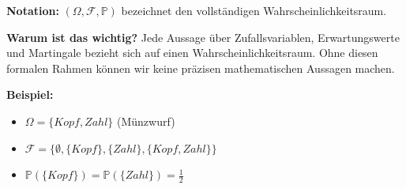 \begin{denoobification}[Wahrscheinlichkeitsraum]
\textbf{Notation:} $(\Omega, \mathcal{F}, \mathbb{P})$ bezeichnet den vollständigen Wahrscheinlichkeitsraum.

\textbf{Warum ist das wichtig?} Jede Aussage über Zufallsvariablen, Erwartungswerte und Martingale bezieht sich auf einen Wahrscheinlichkeitsraum. Ohne diesen formalen Rahmen können wir keine präzisen mathematischen Aussagen machen.

\textbf{Beispiel:} 
\begin{itemize}
    \item $\Omega = \{Kopf, Zahl\}$ (Münzwurf)
    \item $\mathcal{F} = \{\emptyset, \{Kopf\}, \{Zahl\}, \{Kopf, Zahl\}\}$
    \item $\mathbb{P}(\{Kopf\}) = \mathbb{P}(\{Zahl\}) = \frac{1}{2}$
\end{itemize}
\end{denoobification}

